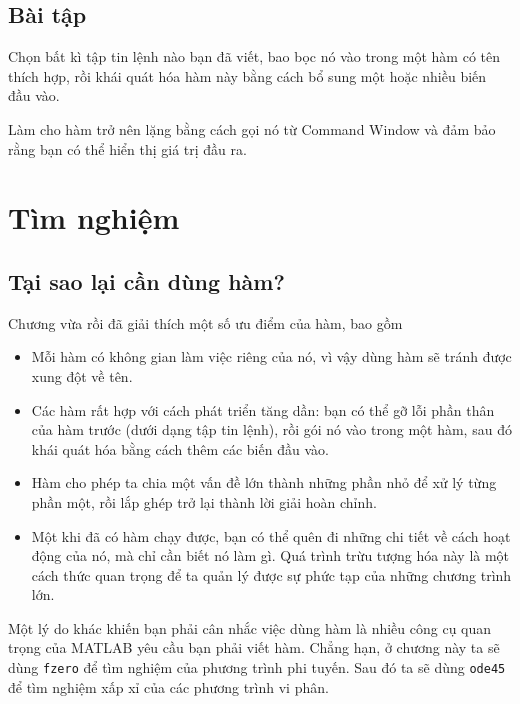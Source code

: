 \documentclass[12pt]{book}
\begin{document}
\section{Bài tập}

\begin{ex}
Chọn bất kì tập tin lệnh nào bạn đã viết, bao bọc nó vào trong
một hàm có tên thích hợp, rồi khái quát hóa hàm này bằng cách
bổ sung một hoặc nhiều biến đầu vào.

Làm cho hàm trở nên lặng bằng cách gọi nó từ Command
Window và đảm bảo rằng bạn có thể hiển thị giá trị đầu ra.
\end{ex}



\chapter{Tìm nghiệm}


\section{Tại sao lại cần dùng hàm?}

Chương vừa rồi đã giải thích một số ưu điểm của hàm, bao gồm

\begin{itemize}

\item Mỗi hàm có không gian làm việc riêng của nó, vì vậy dùng hàm 
sẽ tránh được xung đột về tên.

\item Các hàm rất hợp với cách phát triển tăng dần: bạn có thể gỡ lỗi
phần thân của hàm trước (dưới dạng tập tin lệnh), rồi gói nó vào
trong một hàm, sau đó khái quát hóa bằng cách thêm các biến đầu vào.

\item Hàm cho phép ta chia một vấn đề lớn thành những phần nhỏ
để xử lý từng phần một, rồi lắp ghép trở lại thành lời giải hoàn chỉnh.

\item Một khi đã có hàm chạy được, bạn có thể quên đi những chi tiết
về cách hoạt động của nó, mà chỉ cần biết nó làm gì. Quá trình trừu tượng hóa
này là một cách thức quan trọng để ta quản lý được sự phức tạp của
những chương trình lớn.

\end{itemize}

Một lý do khác khiến bạn phải cân nhắc việc dùng hàm là nhiều công cụ
quan trọng của MATLAB yêu cầu bạn phải viết hàm. Chẳng hạn, ở 
chương này ta sẽ dùng {\tt fzero} để tìm nghiệm của phương trình
phi tuyến. Sau đó ta sẽ dùng {\tt ode45} để tìm nghiệm xấp xỉ của
các phương trình vi phân.
\end{document}
